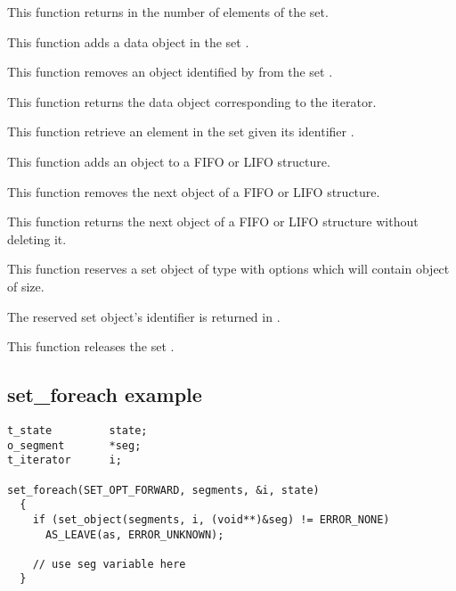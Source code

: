 	 {
	   This function returns in  the number of elements
	   of the set.
	 }

	 {
	   This function adds a data object in the set .
	 }

	 {
	   This function removes an object identified by 
	   from the set .
	 }

	 {
	   This function returns the data object corresponding to
	   the iterator.
	 }

         {
	   This function retrieve an element in the set given its
	   identifier .
	 }

	 {
	   This function adds an object to a FIFO or LIFO structure.
	 }

	 {
	   This function removes the next object of a FIFO or LIFO structure.
	 }

	 {
	   This function returns the next object of a FIFO or LIFO structure
	   without deleting it.
	 }

	 {
	   This function reserves a set object of type 
	   with options  which will contain object of
	    size.

	   The reserved set object's identifier is returned in
	   .
	 }

	 {
	   This function releases the set .
	 }

\subsection*{set\_foreach example}

\begin{verbatim}
t_state         state;
o_segment       *seg;
t_iterator      i;

set_foreach(SET_OPT_FORWARD, segments, &i, state)
  {
    if (set_object(segments, i, (void**)&seg) != ERROR_NONE)
      AS_LEAVE(as, ERROR_UNKNOWN);

    // use seg variable here
  }
\end{verbatim}


